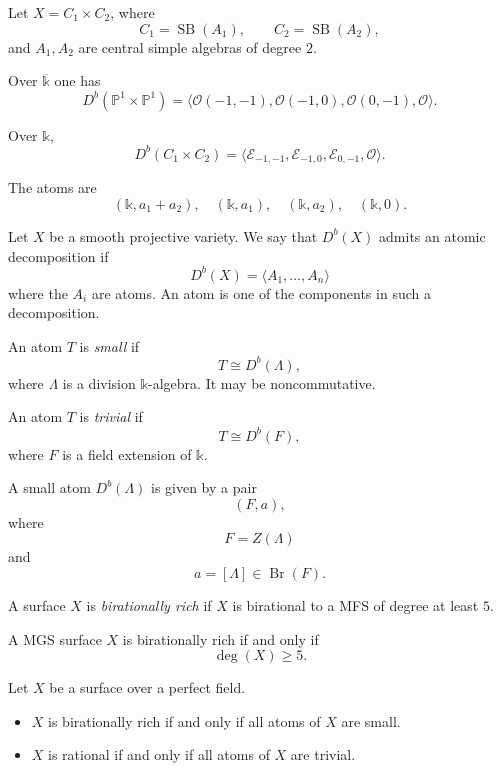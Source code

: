 \begin{example}
Let $X=C_1\times C_2$, where
$$
C_1=\operatorname{SB}(A_1),
\qquad
C_2=\operatorname{SB}(A_2),
$$
and $A_1,A_2$ are central simple
algebras of degree $2$.

Over $\overline{\mathbb k}$ one has
$$
D^b(\mathbb P^1\times \mathbb P^1)
=
\langle
\mathcal O(-1,-1),
\mathcal O(-1,0),
\mathcal O(0,-1),
\mathcal O
\rangle.
$$

Over $\mathbb k$,
$$
D^b(C_1\times C_2)
=
\langle
\mathcal E_{-1,-1},
\mathcal E_{-1,0},
\mathcal E_{0,-1},
\mathcal O
\rangle.
$$

The atoms are
$$
(\mathbb k,a_1+a_2),\quad
(\mathbb k,a_1),\quad
(\mathbb k,a_2),\quad
(\mathbb k,0).
$$
\end{example}

\begin{definition}
Let $X$ be a smooth projective variety.
We say that $D^b(X)$ admits an atomic
decomposition if
$$
D^b(X)=\langle A_1,\dots,A_n\rangle
$$
where the $A_i$ are atoms.
An atom is one of the components in
such a decomposition.
\end{definition}

\begin{definition}
An atom $T$ is {\it small} if
$$
T\cong D^b(\Lambda),
$$
where $\Lambda$ is a division
$\mathbb k$-algebra.
It may be noncommutative.
\end{definition}

\begin{definition}
An atom $T$ is {\it trivial} if
$$
T\cong D^b(F),
$$
where $F$ is a field extension of
$\mathbb k$.
\end{definition}

\begin{remark}
A small atom $D^b(\Lambda)$ is given
by a pair
$$
(F,a),
$$
where
$$
F=Z(\Lambda)
$$
and
$$
a=[\Lambda]\in \operatorname{Br}(F).
$$
\end{remark}

\begin{definition}
A surface $X$ is {\it birationally
rich} if $X$ is birational to a MFS
of degree at least $5$.
\end{definition}

\begin{remark}
A MGS surface $X$ is birationally rich
if and only if
$$
\deg(X)\geq 5.
$$
\end{remark}

\begin{theorem}
Let $X$ be a surface over a perfect
field.
\begin{itemize}
\item $X$ is birationally rich if and
only if all atoms of $X$ are small.
\item $X$ is rational if and only if
all atoms of $X$ are trivial.
\end{itemize}
\end{theorem}

